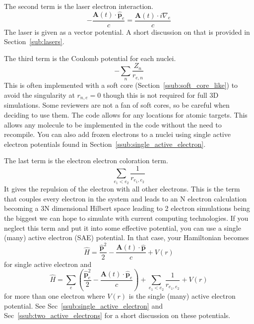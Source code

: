 \documentclass{article}
\begin{document}
The second term is the laser electron interaction.
\begin{equation}
  - \frac{\mathbf{A}(t) \cdot \hat{\mathbf{p}}_e}{c} = \frac{\mathbf{A}(t) \cdot i\nabla_e}{c}
\end{equation}
The laser is given as a vector potential. A short discussion on that is provided in Section~\ref{sub:lasers}.

The third term is the Coulomb potential for each nuclei.
\begin{equation}
  - \sum_{n} \frac{Z_n}{r_{e,n}}
\end{equation}
This is often implemented with a soft core (Section~\ref{ssub:soft_core_like}) to avoid the singularity at $r_{n,e}=0$ though this is not required for full 3D simulations. Some reviewers are not a fan of soft cores, so be careful when deciding to use them. The code allows for any locations for atomic targets. This allows any molecule to be implemented in the code without the need to recompile. You can also add frozen electrons to a nuclei using single active electron potentials found in Section~\ref{ssub:single_active_electron}.

The last term is the electron electron coloration term.
\begin{equation}
  \sum_{e_1 < e_2}\frac{1}{r_{e_1, e_2}}
\end{equation}
It gives the repulsion of the electron with all other electrons. This is the term that couples every electron in the system and leads to an N electron calculation becoming a 3N dimensional Hilbert space leading to 2 electron simulations being the biggest we can hope to simulate with current computing technologies. If you neglect this term and put it into some effective potential, you can use a single (many) active electron (SAE) potential. In that case, your Hamiltonian becomes
\begin{equation}
    \label{eq:H_SAE}
    \hat{H} = \frac{\hat{\mathbf{p}}^2}{2} - \frac{\mathbf{A}(t) \cdot \hat{\mathbf{p}}}{c} + V(r)
\end{equation}
for single active electron and
\begin{equation}
    \label{eq:H_TAE}
    \hat{H} = \sum_{e}\left(\frac{\hat{\mathbf{p}}^2_e}{2} - \frac{\mathbf{A}(t) \cdot \hat{\mathbf{p}}_e}{c}\right) + \sum_{e_1 < e_2}\frac{1}{r_{e_1, e_2}} + V(r)
\end{equation}
for more than one electron where $V(r)$ is the single (many) active electron potential. See Sec~\ref{ssub:single_active_electron} and  Sec~\ref{ssub:two_active_electrons} for a short discussion on these potentials.
\end{document}
